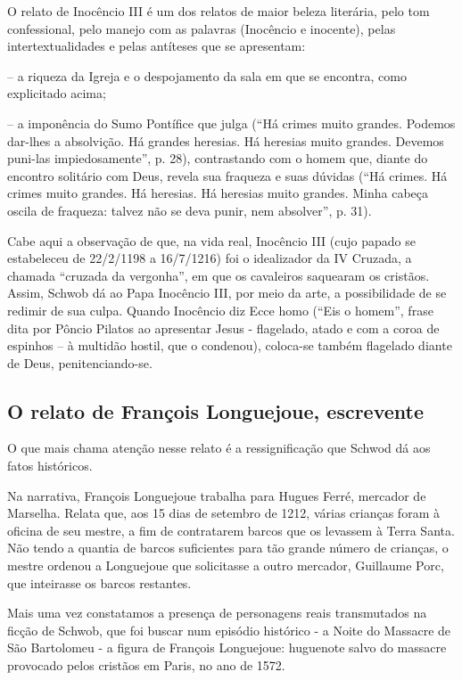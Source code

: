 \documentclass[12pt]{extarticle}
\begin{document}
O relato de Inocêncio III é um dos relatos de maior beleza literária,
pelo tom confessional, pelo manejo com as palavras (Inocêncio e
inocente), pelas intertextualidades e pelas antíteses que se
apresentam:

-- a riqueza da Igreja e o despojamento da sala em que se encontra, como
explicitado acima;

-- a imponência do Sumo Pontífice que julga (``Há crimes muito grandes.
Podemos dar-lhes a absolvição. Há grandes heresias. Há heresias muito
grandes. Devemos puni-las impiedosamente'', p. 28), contrastando com o
homem que, diante do encontro solitário com Deus, revela sua fraqueza e
suas dúvidas (``Há crimes. Há crimes muito grandes. Há heresias. Há
heresias muito grandes. Minha cabeça oscila de fraqueza: talvez não se
deva punir, nem absolver'', p. 31).

Cabe aqui a observação de que, na vida real, Inocêncio III (cujo papado
se estabeleceu de 22/2/1198 a 16/7/1216) foi o idealizador da IV
Cruzada, a chamada ``cruzada da vergonha'', em que os cavaleiros
saquearam os cristãos. Assim, Schwob dá ao Papa Inocêncio III, por meio
da arte, a possibilidade de se redimir de sua culpa. Quando Inocêncio
diz Ecce homo (``Eis o homem'', frase dita por Pôncio Pilatos ao
apresentar Jesus - flagelado, atado e com a coroa de espinhos -- à
multidão hostil, que o condenou), coloca-se também flagelado diante de
Deus, penitenciando-se.




\subsection{O relato de François Longuejoue, escrevente}

O que mais chama atenção nesse relato é a ressignificação que Schwod dá
aos fatos históricos.

Na narrativa, François Longuejoue trabalha para Hugues Ferré, mercador
de Marselha. Relata que, aos 15 dias de setembro de 1212, várias
crianças foram à oficina de seu mestre, a fim de contratarem barcos que
os levassem à Terra Santa. Não tendo a quantia de barcos suficientes
para tão grande número de crianças, o mestre ordenou a Longuejoue que
solicitasse a outro mercador, Guillaume Porc, que inteirasse os barcos
restantes.

Mais uma vez constatamos a presença de personagens reais transmutados na
ficção de Schwob, que foi buscar num episódio histórico - a Noite do
Massacre de São Bartolomeu -  a figura de François Longuejoue:
huguenote salvo do massacre provocado pelos cristãos em Paris, no ano de
1572.
\end{document}
